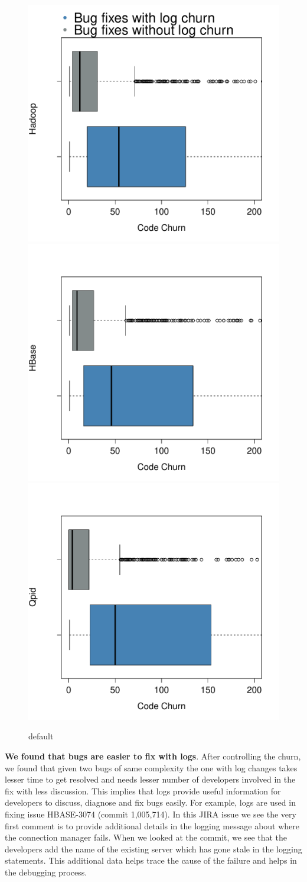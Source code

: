 \begin{figure}
	
	\centering
	\includegraphics[width=.25\textwidth]{HadoopBoxPlot}
	\hfill
	\includegraphics[width=.25\textwidth]{HBaseBoxPlot}\hfill
	\includegraphics[width=.25\textwidth]{QpidBoxPlot}
	
	\caption{default}
	\label{fig:figure3}
	
\end{figure}



\textbf{We found that bugs are easier to fix with logs}. After controlling the churn, we found that given two bugs of same complexity the one with log changes takes lesser time to
get resolved and needs lesser number of developers involved in the fix with less discussion. This implies that logs provide useful information for developers to discuss, diagnose and fix bugs easily. For example, logs are used in fixing issue HBASE-3074 (commit 1,005,714).
In this JIRA issue we see the very first comment is to provide additional
details in the logging message about where the connection manager
fails. When we looked at the commit, we see that the developers add
the name of the existing server which has gone stale in the logging statements. This additional data helps trace the cause of the failure and helps in the debugging process.  


%




